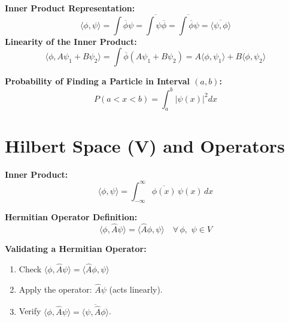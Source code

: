 \documentclass[a4paper,11pt]{article}
\renewcommand{\textbf}[1]{{\scriptsize	\bfseries #1}}
\begin{document}
\begin{footnotesize}
\begin{multicols}{2}
\begin{minipage}{\linewidth}
\textbf{Inner Product Representation:}
\[
\langle \phi, \psi \rangle = \int \overline{\phi} \psi = \overline{\int \psi \overline{\phi}}= \overline{\int \overline{\phi}\psi } = \overline{\langle \psi, \phi \rangle}
\]
\textbf{Linearity of the Inner Product:}
\[
\langle \phi, A \psi_1 + B \psi_2 \rangle = \int \overline{\phi} (A \psi_1 + B \psi_2)  
= A \langle \phi, \psi_1 \rangle + B \langle \phi, \psi_2 \rangle
\]

\end{minipage}


\begin{minipage}{\linewidth}

\textbf{Probability of Finding a Particle in Interval $(a, b)$:} \\[-0.2cm]
\[
P(a < x < b) = \int_a^b |\psi(x)|^2 dx
\]

\end{minipage}


\begin{minipage}{\linewidth}
\section*{Hilbert Space (V) and Operators}
\textbf{Inner Product:} \\[-0.2cm]
\[
\langle \phi, \psi \rangle = \int_{-\infty}^{\infty} \overline{\phi(x)} \, \psi(x) \, dx
\]
\end{minipage}


\begin{minipage}{\linewidth}
\textbf{Hermitian Operator Definition:} \\[-0.2cm]
\[
\langle \phi, \hat{A} \psi \rangle = \langle \hat{A} \phi, \psi \rangle \quad \forall \,  \phi,\,\, \psi \in V
\]

\end{minipage}

\textbf{Validating a Hermitian Operator:}
\begin{enumerate}
    \item Check  \(\langle \phi, \hat{A} \psi \rangle = \langle \hat{A} \phi, \psi \rangle\)
    \item Apply the operator: \(\hat{A} \psi\) (acts linearly).
    \item Verify  \(\langle \phi, \hat{A} \psi \rangle = \overline{\langle \psi, \hat{A} \phi \rangle}\).
\end{enumerate}



\end{multicols}
\end{footnotesize}
\end{document}
